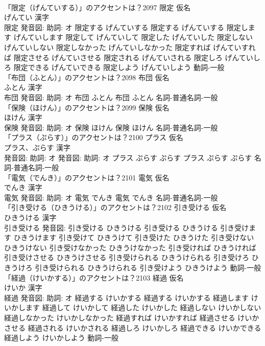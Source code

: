 \documentclass[8pt]{extreport}
\begin{document}
\begin{CJK}{UTF8}{min}
\\	「限定（げんていする）」のアクセントは？2097	限定 仮名　
\\	げんてい 漢字　
\\	限定 発音図: 助詞: オ	限定する げんていする		限定する げんていする 限定します げんていします 限定して げんていして 限定した げんていした 限定しない げんていしない 限定しなかった げんていしなかった 限定すれば げんていすれば 限定させる げんていさせる 限定される げんていされる 限定しろ げんていしろ 限定できる げんていできる 限定しよう げんていしよう				動詞-一般 
\\	「布団（ふとん）」のアクセントは？2098	布団 仮名　
\\	ふとん 漢字　
\\	布団 発音図: 助詞: オ	布団 ふとん		布団 ふとん				名詞-普通名詞-一般 
\\	「保険（ほけん）」のアクセントは？2099	保険 仮名　
\\	ほけん 漢字　
\\	保険 発音図: 助詞: オ	保険 ほけん		保険 ほけん				名詞-普通名詞-一般 
\\	「プラス（ぷらす）」のアクセントは？2100	プラス 仮名　
\\	プラス、ぷらす 漢字　
\\	発音図: 助詞: オ 発音図: 助詞: オ	プラス ぷらす ぷらす		プラス ぷらす ぷらす				名詞-普通名詞-一般 
\\	「電気（でんき）」のアクセントは？2101	電気 仮名　
\\	でんき 漢字　
\\	電気 発音図: 助詞: オ	電気 でんき		電気 でんき				名詞-普通名詞-一般 
\\	「引き受ける（ひきうける）」のアクセントは？2102	引き受ける 仮名　
\\	ひきうける 漢字　
\\	引き受ける 発音図:	引き受ける ひきうける		引き受ける ひきうける 引き受けます ひきうけます 引き受けて ひきうけて 引き受けた ひきうけた 引き受けない ひきうけない 引き受けなかった ひきうけなかった 引き受ければ ひきうければ 引き受けさせる ひきうけさせる 引き受けられる ひきうけられる 引き受けろ ひきうけろ 引き受けられる ひきうけられる 引き受けよう ひきうけよう				動詞-一般 
\\	「経過（けいかする）」のアクセントは？2103	経過 仮名　
\\	けいか 漢字　
\\	経過 発音図: 助詞: オ	経過する けいかする		経過する けいかする 経過します けいかします 経過して けいかして 経過した けいかした 経過しない けいかしない 経過しなかった けいかしなかった 経過すれば けいかすれば 経過させる けいかさせる 経過される けいかされる 経過しろ けいかしろ 経過できる けいかできる 経過しよう けいかしよう				動詞-一般 

\end{CJK}
\end{document}
